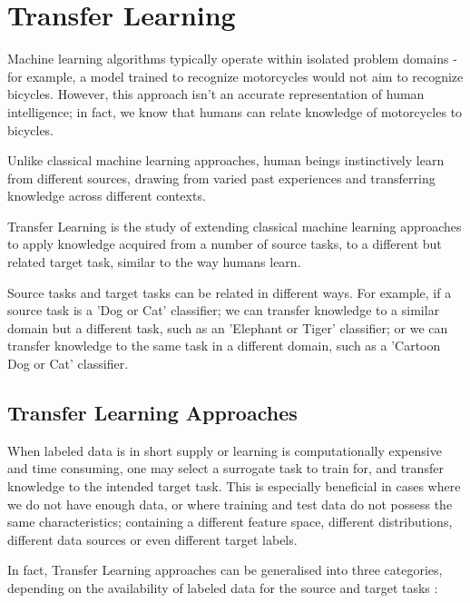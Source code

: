 \chapter[Transfer Learning]{Transfer Learning}
\label{ch:transfer-learning}

Machine learning algorithms typically operate within isolated problem domains - for example, a model trained to recognize motorcycles would not aim to recognize bicycles. However, this approach isn’t an accurate representation of human intelligence; in fact, we know that humans can relate knowledge of motorcycles to bicycles. \citet{Aytar11}

Unlike classical machine learning approaches, human beings instinctively learn from different sources, drawing from varied past experiences and transferring knowledge across different contexts. 

Transfer Learning is the study of extending classical machine learning approaches to apply knowledge acquired from a number of source tasks, to a different but related target task, similar to the way humans learn. \citet{thrunpratt1998}

Source tasks and target tasks can be related in different ways. For example, if a source task is a 'Dog or Cat' classifier; we can transfer knowledge to a similar domain but a different task, such as an 'Elephant or Tiger' classifier; or we can transfer knowledge to the same task in a different domain, such as a 'Cartoon Dog or Cat' classifier. \citet{torrey2009}


\section{Transfer Learning Approaches}\label{sec:transfer-learning-approaches}

When labeled data is in short supply or learning is computationally expensive and time consuming, one may select a surrogate task to train for, and transfer knowledge to the intended target task.  This is especially beneficial in cases where we do not have enough data, or where training and test data do not possess the same characteristics; containing a different feature space, different distributions, different data sources or even different target labels. 

In fact, Transfer Learning approaches can be generalised into three categories, depending on the availability of labeled data for the source and target tasks \citet{panyang2010}:

